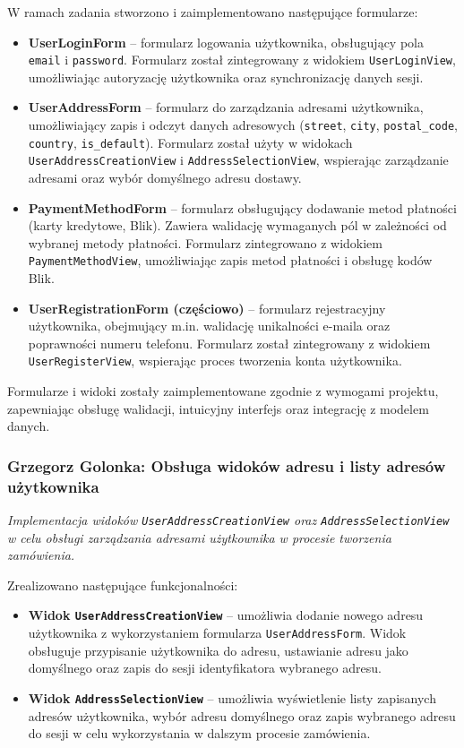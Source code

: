\documentclass[12pt,a4paper,oneside]{article}
\theoremstyle{definition}
\numberwithin{equation}{section}
\begin{document}
W ramach zadania stworzono i zaimplementowano następujące formularze:
\begin{itemize}
    \item \textbf{UserLoginForm} – formularz logowania użytkownika, obsługujący pola \texttt{email} i \texttt{password}. Formularz został zintegrowany z widokiem \texttt{UserLoginView}, umożliwiając autoryzację użytkownika oraz synchronizację danych sesji.
    \item \textbf{UserAddressForm} – formularz do zarządzania adresami użytkownika, umożliwiający zapis i odczyt danych adresowych (\texttt{street}, \texttt{city}, \texttt{postal\_code}, \texttt{country}, \texttt{is\_default}). Formularz został użyty w widokach \texttt{UserAddressCreationView} i \texttt{AddressSelectionView}, wspierając zarządzanie adresami oraz wybór domyślnego adresu dostawy.
    \item \textbf{PaymentMethodForm} – formularz obsługujący dodawanie metod płatności (karty kredytowe, Blik). Zawiera walidację wymaganych pól w zależności od wybranej metody płatności. Formularz zintegrowano z widokiem \texttt{PaymentMethodView}, umożliwiając zapis metod płatności i obsługę kodów Blik.
    \item \textbf{UserRegistrationForm (częściowo)} – formularz rejestracyjny użytkownika, obejmujący m.in. walidację unikalności e-maila oraz poprawności numeru telefonu. Formularz został zintegrowany z widokiem \texttt{UserRegisterView}, wspierając proces tworzenia konta użytkownika.
\end{itemize}

Formularze i widoki zostały zaimplementowane zgodnie z wymogami projektu, zapewniając obsługę walidacji, intuicyjny interfejs oraz integrację z modelem danych.
% 
% 
\subsubsection{Grzegorz Golonka: Obsługa widoków adresu i listy adresów użytkownika}
\label{section:1.3.22}
\textit{
Implementacja widoków \texttt{UserAddressCreationView} oraz \texttt{AddressSelectionView} w celu obsługi zarządzania adresami użytkownika w procesie tworzenia zamówienia.
}

Zrealizowano następujące funkcjonalności:
\begin{itemize}
    \item \textbf{Widok \texttt{UserAddressCreationView}} – umożliwia dodanie nowego adresu użytkownika z wykorzystaniem formularza \texttt{UserAddressForm}. Widok obsługuje przypisanie użytkownika do adresu, ustawianie adresu jako domyślnego oraz zapis do sesji identyfikatora wybranego adresu.
    \item \textbf{Widok \texttt{AddressSelectionView}} – umożliwia wyświetlenie listy zapisanych adresów użytkownika, wybór adresu domyślnego oraz zapis wybranego adresu do sesji w celu wykorzystania w dalszym procesie zamówienia.
\end{itemize}
\end{document}
